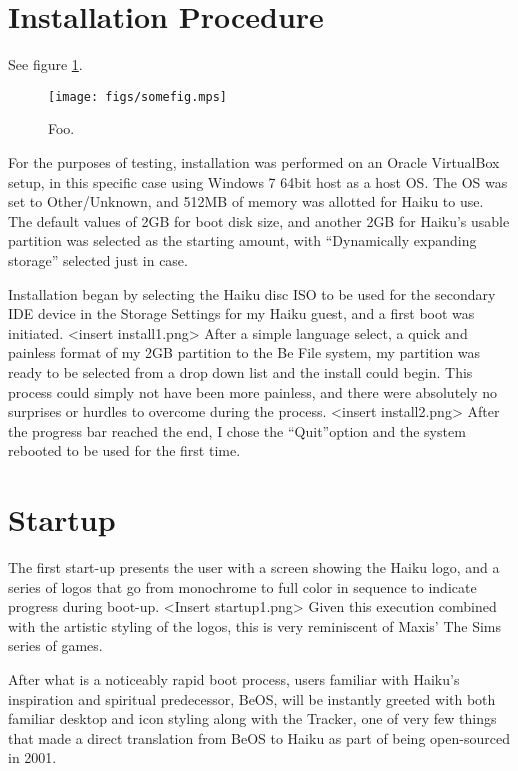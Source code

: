 \documentclass{article}
\begin{document}
\section{Installation Procedure}

See figure \ref{fig:foo}.

\begin{figure}[h]
\centering
\texttt{[image: figs/somefig.mps]}
\caption{Foo.}
\label{fig:foo}
\end{figure}

For the purposes of testing, installation was performed on an Oracle 
VirtualBox setup, in this specific case using Windows 7 64bit host as
a host OS. The OS was set to Other/Unknown, and 512MB of memory was 
allotted for Haiku to use. The default values of 2GB for boot disk size,
and another 2GB for Haiku’s usable partition was selected as the starting 
amount, with “Dynamically expanding storage” selected just in case.

Installation began by selecting the Haiku disc ISO to be used for 
the secondary IDE device in the Storage Settings for my Haiku guest, and 
a first boot was initiated. <insert install1.png> After a simple language 
select, a quick and painless format of my 2GB partition to the Be File 
system, my partition was ready to be selected from a drop down list and 
the install could begin. This process could simply not have been more 
painless, and there were absolutely no surprises or hurdles to overcome 
during the process. <insert install2.png> After the progress bar reached 
the end, I chose the “Quit”option and the system rebooted to  be used 
for the first time.

\section{Startup}

The first start-up presents the user with a screen showing the Haiku logo, 
and a series of logos that go from monochrome to full color in sequence 
to indicate progress during boot-up.  <Insert startup1.png> Given this 
execution combined with the artistic styling of the logos, this is very 
reminiscent of Maxis’ The Sims series of games.
 
After what is a noticeably rapid boot process, users familiar with Haiku’s 
inspiration and spiritual predecessor, BeOS, will be instantly greeted with 
both familiar desktop and icon styling along with the Tracker, one of very 
few things that made a direct translation from BeOS to Haiku as part of 
being open-sourced in 2001.\cite{HaikuFaq}
\end{document}
